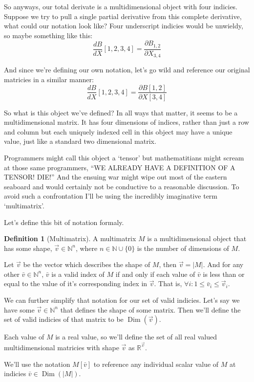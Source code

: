 \documentclass[12pt]{book}
\theoremstyle{plain}
\theoremstyle{definition}
\newtheorem{definition}{Definition}[chapter]
\theoremstyle{ppart}
\theoremstyle{case}
\theoremstyle{solution}
\DeclareMathOperator{\Dim}{Dim}
\newcommand{\shape}[1]{\left|#1\right|}
\begin{document}
So anyways, our total derivate is a multidimensional object with four indicies.
Suppose we try to pull a single partial derivative from this complete derivative,
what could our notation look like? Four underscript indicies would be unwieldy,
so maybe something like this:
\[
\frac{dB}{dX}[1,2,3,4] = \frac{\partial B_{1,2}}{\partial X_{3,4}}
\]

And since we're defining our own notation, let's go wild and reference our original
matricies in a similar manner:
\[
\frac{dB}{dX}[1,2,3,4] = \frac{\partial B[1,2]}{\partial X[3,4]}
\]

So what is this object we've defined? In all ways that matter, it seems to be
a multidimensional matrix. It has four dimensions of indices, rather than just
a row and column but each uniquely indexed cell in this object may have a
unique value, just like a standard two dimensional matrix.

Programmers might call this object a `tensor' but mathematitians might
scream at those same programmers, ``WE ALREADY HAVE A DEFINITION OF A TENSOR! DIE!''
And the ensuing war might wipe out most of the eastern seaboard and would
certainly not be conductive to a reasonable discussion. To avoid such a
confrontation I'll be using the incredibly imaginative term `multimatrix'. 

Let's define this bit of notation formaly.

\begin{definition}[Multimatrix]
A multimatrix $M$ is a multidimensional object that has some shape,
$\vec{v} \in \mathbb{N}^n$, where $n \in \mathbb{N} \cup \{0\}$
is the number of dimensions of $M$.

Let $\vec{v}$ be the vector which describes the shape of
$M$, then $\vec{v} = \shape{M}$. And for any other $\bar{v} \in \mathbb{N}^n$, $\bar{v}$
is a valid index of $M$ if and only if each value of $\bar{v}$ is less than or equal
to the value of it's corresponding index in $\vec{v}$.
That is, $\forall i: 1 \le \bar{v}_i \le \vec{v}_i$.

We can further simplify that notation for our set of valid indicies. Let's say we have
some $\vec{v} \in \mathbb{N}^n$ that defines the shape of some matrix. Then we'll
define the set of valid indicies of that matrix to be $\Dim(\vec{v})$. 

Each value of $M$ is a real value, so we'll define the set of all real valued
multidimensional matricies with shape $\vec{v}$ as $\mathbb{R}^{\vec{v}}$.

We'll use the notation $M[\bar{v}]$ to reference any individual scalar value of $M$
at indicies $\bar{v} \in \Dim(\shape{M})$. 
\end{definition}
\end{document}

